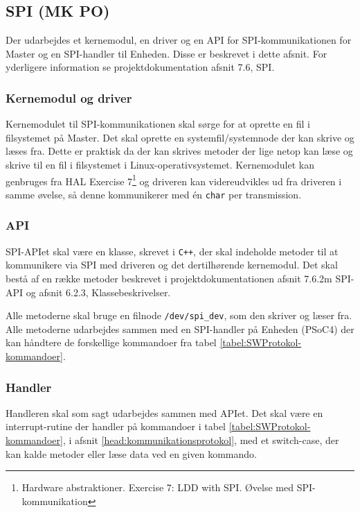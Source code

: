 \subsection{SPI (MK PO)}

Der udarbejdes et kernemodul, en driver og en API for SPI-kommunikationen for Master og en SPI-handler til Enheden. Disse er beskrevet i dette afsnit. For yderligere information se projektdokumentation afsnit 7.6, SPI.

\subsubsection*{Kernemodul og driver}

Kernemodulet til SPI-kommunikationen skal sørge for at oprette en fil i filsystemet på Master. Det skal oprette en systemfil/systemnode der kan skrive og læses fra. Dette er praktisk da der kan skrives metoder der lige netop kan læse og skrive til en fil i filsystemet i Linux-operativsystemet. Kernemodulet kan genbruges fra HAL Exercise 7\footnote{Hardware abstraktioner. Exercise 7: LDD with SPI. Øvelse med SPI-kommunikation} og driveren kan videreudvikles ud fra driveren i samme øvelse, så denne kommunikerer med én \verb+char+ per transmission.

\subsubsection*{API}

SPI-APIet skal være en klasse, skrevet i \verb-C++-, der skal indeholde metoder til at kommunikere via SPI med driveren og det dertilhørende kernemodul. Det skal bestå af en række metoder beskrevet i projektdokumentationen afsnit 7.6.2m SPI-API og afsnit 6.2.3, Klassebeskrivelser. 

Alle metoderne skal bruge en filnode \verb+/dev/spi_dev+, som den skriver og læser fra. Alle metoderne udarbejdes sammen med en SPI-handler på Enheden (PSoC4) der kan håndtere de forskellige kommandoer fra tabel \ref{tabel:SWProtokol-kommandoer}.

\subsubsection*{Handler}

Handleren skal som sagt udarbejdes sammen med APIet. Det skal være en interrupt-rutine der handler på kommandoer i tabel \ref{tabel:SWProtokol-kommandoer}, i afsnit \ref{head:kommunikationsprotokol}, med et switch-case, der kan kalde metoder eller læse data ved en given kommando.